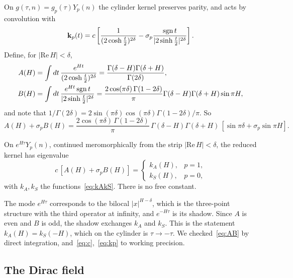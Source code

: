 On $g(\tau,n)=g_p(\tau)Y_p(n)$ the cylinder kernel preserves parity, and acts by convolution with
\begin{equation}\label{eq:kp-position}
\mathbf k_p(t)=c\left[\frac{1}{(2\cosh\frac t2)^{2\delta}}-\sigma_p\frac{\operatorname{sgn} t}{|2\sinh\frac t2|^{2\delta}}\right].
\end{equation}
Define, for $|\mathrm{Re}\,H|<\delta$,
\begin{equation}\label{eq:AB}
\begin{aligned}
A(H)&=\int dt\,\frac{e^{Ht}}{(2\cosh\frac t2)^{2\delta}}=\frac{\Gamma(\delta-H)\Gamma(\delta+H)}{\Gamma(2\delta)},\\
B(H)&=\int dt\,\frac{e^{Ht}\operatorname{sgn} t}{|2\sinh\frac t2|^{2\delta}}=\frac{2\cos(\pi\delta)\,\Gamma(1-2\delta)}{\pi}\Gamma(\delta-H)\Gamma(\delta+H)\sin\pi H,
\end{aligned}
\end{equation}
and note that $1/\Gamma(2\delta)=2\sin(\pi\delta)\cos(\pi\delta)\Gamma(1-2\delta)/\pi$. So
\begin{equation}\label{eq:AplusB}
A(H)+\sigma_pB(H)=\frac{2\cos(\pi\delta)\,\Gamma(1-2\delta)}{\pi}\,\Gamma(\delta-H)\Gamma(\delta+H)\,[\sin\pi\delta+\sigma_p\sin\pi H].
\end{equation}

\begin{proposition}\label{prop:kernel}
On $e^{H\tau}Y_p(n)$, continued meromorphically from the strip $|\mathrm{Re}\,H|<\delta$, the reduced kernel has eigenvalue
\begin{equation}\label{eq:kp}
c\,[A(H)+\sigma_pB(H)]=
\begin{cases}k_A(H),&p=1,\\ k_S(H),&p=0,\end{cases}
\end{equation}
with $k_A,k_S$ the functions~\eqref{eq:kAkS}. There is no free constant.
\end{proposition}

The mode $e^{H\tau}$ corresponds to the bilocal $|x|^{H-\delta}$, which is the three-point structure with the third operator at infinity, and $e^{-H\tau}$ is its shadow. Since $A$ is even and $B$ is odd, the shadow exchanges $k_A$ and $k_S$. This is the statement $k_A(H)=k_S(-H)$, which on the cylinder is $\tau\to-\tau$. We checked~\eqref{eq:AB} by direct integration, and~\eqref{eq:c},~\eqref{eq:kp} to working precision.

\subsection{The Dirac field}
\label{subsec:dirac-field}

